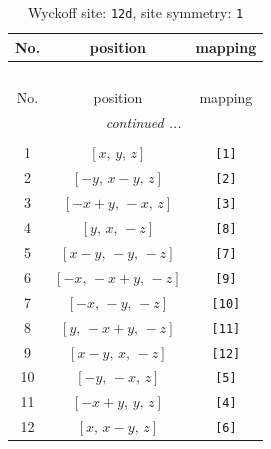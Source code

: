 \documentclass[fleqn,8pt]{jsarticle}
\begin{document}
\renewcommand{\arraystretch}{1.2}
\begin{longtable}{ccc}
\caption{Wyckoff site: {\tt 12d}, site symmetry: {\tt 1}}
 \\
 \hline \hline
No. & position & mapping \\ \hline \endfirsthead

\multicolumn{2}{l}{\tablename\ \thetable{}} \\
 \hline \hline
No. & position & mapping \\ \hline \endhead

 \hline \hline
\multicolumn{2}{r}{\footnotesize\it continued ...} \\ \endfoot

 \hline \hline
\multicolumn{2}{r}{} \\ \endlastfoot

1 & $\left[ x,\, y,\, z \right]$ & {\tt [1]} \\ \hline
2 & $\left[ - y,\, x - y,\, z \right]$ & {\tt [2]} \\ \hline
3 & $\left[ - x + y,\, - x,\, z \right]$ & {\tt [3]} \\ \hline
4 & $\left[ y,\, x,\, - z \right]$ & {\tt [8]} \\ \hline
5 & $\left[ x - y,\, - y,\, - z \right]$ & {\tt [7]} \\ \hline
6 & $\left[ - x,\, - x + y,\, - z \right]$ & {\tt [9]} \\ \hline
7 & $\left[ - x,\, - y,\, - z \right]$ & {\tt [10]} \\ \hline
8 & $\left[ y,\, - x + y,\, - z \right]$ & {\tt [11]} \\ \hline
9 & $\left[ x - y,\, x,\, - z \right]$ & {\tt [12]} \\ \hline
10 & $\left[ - y,\, - x,\, z \right]$ & {\tt [5]} \\ \hline
11 & $\left[ - x + y,\, y,\, z \right]$ & {\tt [4]} \\ \hline
12 & $\left[ x,\, x - y,\, z \right]$ & {\tt [6]} \\
\end{longtable}
\end{document}
